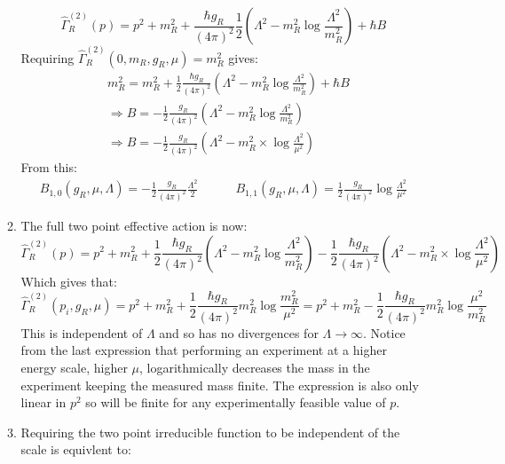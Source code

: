 \documentclass[12pt,a4]{article}
\begin{document}
\begin{enumerate}
\begin{enumerate}
\begin{equation*}
          \hat\Gamma^{(2)}_R(p) = p^2 + m_R^2 + \frac{\hbar g_R }{(4\pi)^2}\frac{1}{2} \left(\Lambda^2 - m_R^2 \log \frac{\Lambda^2}{m_R^2}\right)+ \hbar B
        \end{equation*}
        Requiring $\hat\Gamma^{(2)}_R(0, m_R, g_R , \mu) = m_R^2$ gives:
        \begin{align*}
          & m_R^2 = m_R^2 + \frac{1}{2}\frac{\hbar g_R }{(4\pi)^2} \left(\Lambda^2 - m_R^2 \log \frac{\Lambda^2}{m_R^2}\right)+ \hbar B\\
          &\Rightarrow  B = - \frac{1}{2}\frac{ g_R }{(4\pi)^2}\left(\Lambda^2 - m_R^2 \log \frac{\Lambda^2}{m_R^2}\right)\\
          &\Rightarrow  B = - \frac{1}{2}\frac{ g_R }{(4\pi)^2}\left(\Lambda^2 - m_R^2\times \log \frac{\Lambda^2}{\mu^2}\right)
        \end{align*}
        From this:
        \begin{gather*}
          B_{1, 0}(g_R, \mu, \Lambda) = - \frac{1}{2}\frac{ g_R }{(4\pi)^2}\frac{\Lambda^2}{2} \qquad \quad B_{1, 1}(g_R, \mu, \Lambda) = \frac{1}{2} \frac{ g_R }{(4\pi)^2} \log \frac{\Lambda^2}{\mu^2}
        \end{gather*}
      \item
        The full two point effective action is now:
        \begin{equation*}
          \hat\Gamma^{(2)}_R(p) = p^2 + m_R^2 + \frac{1}{2} \frac{\hbar g_R }{(4\pi)^2} \left(\Lambda^2 - m_R^2 \log \frac{\Lambda^2}{m_R^2}\right)  - \frac{1}{2} \frac{ \hbar g_R }{(4\pi)^2}\left(\Lambda^2 - m_R^2\times \log \frac{\Lambda^2}{\mu^2}\right)
        \end{equation*}
        Which gives that:
        \begin{equation*}
          \hat\Gamma^{(2)}_R(p_i, g_R, \mu) = p^2 + m_R^2 + \frac{1}{2}\frac{\hbar g_R }{(4\pi)^2}  m_R^2 \log \frac{m_R^2}{\mu^2} = p^2 + m_R^2 - \frac{1}{2} \frac{\hbar g_R }{(4\pi)^2}  m_R^2 \log \frac{\mu^2}{m_R^2}
        \end{equation*}
        This is independent of $\Lambda$ and so has no divergences for $\Lambda \to \infty$.
        Notice from the last expression that performing an experiment at a higher energy scale, higher $\mu$, logarithmically decreases the mass in the experiment keeping the measured mass finite.
        The expression is also only linear in $p^2$ so will be finite for any experimentally feasible value of $p$.
      \item
        Requiring the two point irreducible function to be independent of the scale is equivlent to:

\end{enumerate}
\end{enumerate}
\end{document}
